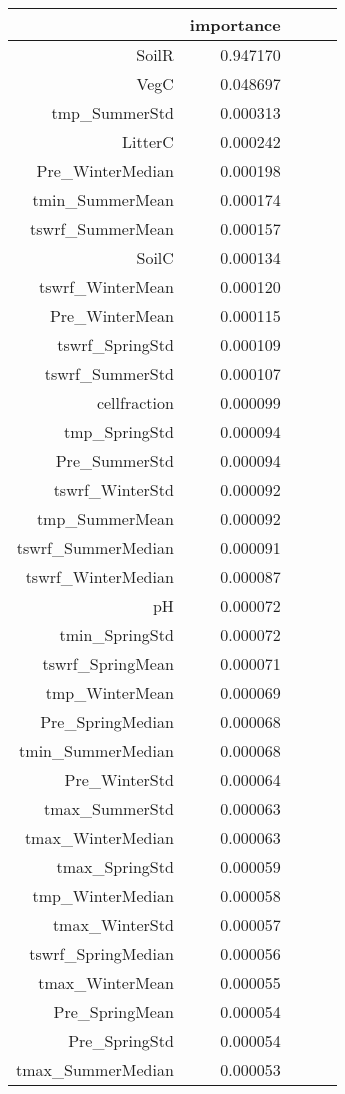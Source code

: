 \begin{tabular}{rrrrr}
\toprule
 & importance \\
\midrule
SoilR & 0.947170 \\
VegC & 0.048697 \\
tmp_SummerStd & 0.000313 \\
LitterC & 0.000242 \\
Pre_WinterMedian & 0.000198 \\
tmin_SummerMean & 0.000174 \\
tswrf_SummerMean & 0.000157 \\
SoilC & 0.000134 \\
tswrf_WinterMean & 0.000120 \\
Pre_WinterMean & 0.000115 \\
tswrf_SpringStd & 0.000109 \\
tswrf_SummerStd & 0.000107 \\
cellfraction & 0.000099 \\
tmp_SpringStd & 0.000094 \\
Pre_SummerStd & 0.000094 \\
tswrf_WinterStd & 0.000092 \\
tmp_SummerMean & 0.000092 \\
tswrf_SummerMedian & 0.000091 \\
tswrf_WinterMedian & 0.000087 \\
pH & 0.000072 \\
tmin_SpringStd & 0.000072 \\
tswrf_SpringMean & 0.000071 \\
tmp_WinterMean & 0.000069 \\
Pre_SpringMedian & 0.000068 \\
tmin_SummerMedian & 0.000068 \\
Pre_WinterStd & 0.000064 \\
tmax_SummerStd & 0.000063 \\
tmax_WinterMedian & 0.000063 \\
tmax_SpringStd & 0.000059 \\
tmp_WinterMedian & 0.000058 \\
tmax_WinterStd & 0.000057 \\
tswrf_SpringMedian & 0.000056 \\
tmax_WinterMean & 0.000055 \\
Pre_SpringMean & 0.000054 \\
Pre_SpringStd & 0.000054 \\
tmax_SummerMedian & 0.000053 \\

\end{tabular}
